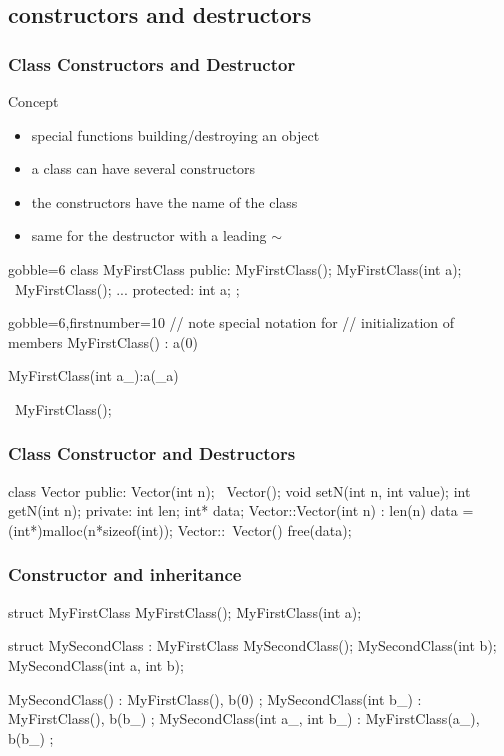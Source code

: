 \subsection{constructors and destructors}


\begin{frame}[fragile]
  \frametitle{Class Constructors and Destructor}
  \begin{block}{Concept}
    \begin{itemize}
    \item special functions building/destroying an object
    \item a class can have several constructors
    \item the constructors have the name of the class
    \item same for the destructor with a leading $\sim$
    \end{itemize}
  \end{block}
  \begin{multicols}{2}
    \begin{cppcode*}{gobble=6}
      class MyFirstClass {
      public:
        MyFirstClass();
        MyFirstClass(int a);
        ~MyFirstClass();
        ...
      protected:
        int a;
      };
    \end{cppcode*}
    \columnbreak
    \begin{cppcode*}{gobble=6,firstnumber=10}
      // note special notation for
      // initialization of members
      MyFirstClass() : a(0) {}
      
      MyFirstClass(int a_):a(_a) {}

      ~MyFirstClass(){};
    \end{cppcode*}
  \end{multicols}
\end{frame}


\begin{frame}[fragile]
  \frametitle{Class Constructor and Destructors}
  \begin{cppcode*}{}
    class Vector {
    public:
      Vector(int n);
      ~Vector();
      void setN(int n, int value);
      int getN(int n);
    private:
      int len;
      int* data;
    }
    Vector::Vector(int n) : len(n) {
      data = (int*)malloc(n*sizeof(int));
    }
    Vector::~Vector() {
      free(data);
    }
  \end{cppcode*}
\end{frame}


\begin{frame}[fragile]
  \frametitle{Constructor and inheritance}
  \begin{cppcode*}{}
    struct MyFirstClass {
      MyFirstClass();
      MyFirstClass(int a);
    }

    struct MySecondClass : MyFirstClass {
      MySecondClass();
      MySecondClass(int b);
      MySecondClass(int a, int b);
    }

    MySecondClass() : MyFirstClass(), b(0) {};
    MySecondClass(int b_) : MyFirstClass(), b(b_) {};
    MySecondClass(int a_,
                  int b_) : MyFirstClass(a_), b(b_) {};
  \end{cppcode*}
\end{frame}

